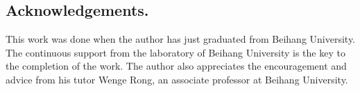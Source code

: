 \documentclass[runningheads]{llncs}
\begin{document}
    \subsection*{Acknowledgements.}
    This work was done when the author has just graduated from Beihang University. The continuous support from the laboratory of Beihang University is the key to the completion of the work. The author also appreciates the encouragement and advice from his tutor Wenge Rong, an associate professor at Beihang University.

    
    
\end{document}
